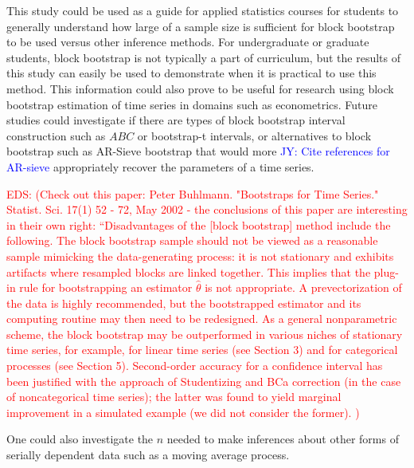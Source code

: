 \documentclass[12pt, letterpaper, titlepage]{article}
\newcommand{\jy}[1]{\textcolor{blue}{JY: #1}}
\newcommand{\eds}[1]{\textcolor{red}{EDS: (#1)}}
\begin{document}
This study could be used as a guide for applied statistics courses for students
to generally understand how large of a sample size is sufficient for block
bootstrap to be used versus other inference methods. For undergraduate or
graduate students, block bootstrap is not typically a part of curriculum, but
the results of this study can easily be used to demonstrate when it is
practical to use this method. This information could also prove to be useful
for research using block bootstrap estimation of time series in domains such
as econometrics. Future studies could investigate if there are types of block
bootstrap interval construction such as $ABC$ or bootstrap-t intervals, or
alternatives to block bootstrap such as AR-Sieve bootstrap that would more
\jy{Cite references for AR-sieve}
appropriately recover the parameters of a time series.

\eds{Check out this paper:
Peter Buhlmann. "Bootstraps for Time Series." Statist. Sci. 17(1) 52 - 72, 
May 2002 - the conclusions of this paper are interesting in their own right:
``Disadvantages of the [block bootstrap] method include the following.
The block bootstrap sample should not be viewed as
a reasonable sample mimicking the data-generating
process: it is not stationary and exhibits artifacts where
resampled blocks are linked together. This implies that
the plug-in rule for bootstrapping an estimator $\hat{\theta}$ is not
appropriate. A prevectorization of the data is highly
recommended, but the bootstrapped estimator and its
computing routine may then need to be redesigned. As
a general nonparametric scheme, the block bootstrap
may be outperformed in various niches of stationary
time series, for example, for linear time series (see Section 3) 
and for categorical processes (see Section 5).
Second-order accuracy for a confidence interval has
been justified with the approach of Studentizing and
BCa correction (in the case of noncategorical time series); 
the latter was found to yield marginal improvement in a 
simulated example (we did not consider the former). }
	
One could also investigate the $n$ needed to make inferences about other forms
of serially dependent data such as a moving average process. 




\end{document}
